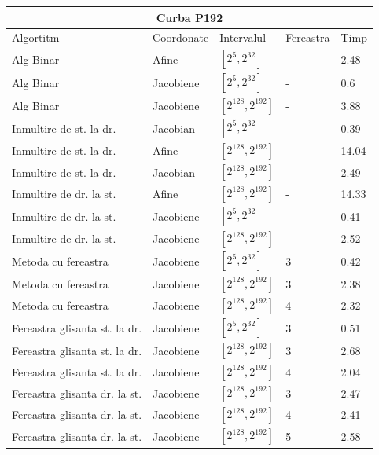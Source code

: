 \begin{tabular}{ |p{5cm}||p{3cm}|p{3cm}|p{2cm}|p{1cm}|  }
 \hline
 \multicolumn{5}{|c|}{Curba P192} \\
 \hline
 Algortitm& Coordonate &Intervalul &Fereastra &Timp\\
 \hline
 Alg Binar & Afine  &$[2^{5},2^{32}]$& - & 2.48\\
 Alg Binar&Jacobiene  & $[2^{5},2^{32}]$ & - & 0.6\\
 Alg Binar&Jacobiene  & $[2^{128},2^{192}]$ & - & 3.88\\
 Inmultire de st. la dr. & Jacobian & $[2^{5},2^{32}]$& - & 0.39\\
 Inmultire de st. la dr. & Afine & $[2^{128},2^{192}]$& - & 14.04\\
 Inmultire de st. la dr. & Jacobian & $[2^{128},2^{192}]$& - & 2.49\\
 Inmultire de dr. la st. &Afine & $[2^{128},2^{192}]$ & - & 14.33\\
 Inmultire de dr. la st. &Jacobiene & $[2^{5},2^{32}]$ & - & 0.41\\
 Inmultire de dr. la st. &Jacobiene & $[2^{128},2^{192}]$ & - & 2.52\\
 Metoda cu fereastra& Jacobiene & $[2^{5},2^{32}]$ & 3 & 0.42\\
 Metoda cu fereastra& Jacobiene & $[2^{128},2^{192}]$ & 3 & 2.38\\
 Metoda cu fereastra& Jacobiene & $[2^{128},2^{192}]$ & 4 & 2.32\\
 Fereastra glisanta st. la dr.& Jacobiene  & $[2^{5},2^{32}]$& 3 & 0.51\\
 Fereastra glisanta st. la dr.& Jacobiene  & $[2^{128},2^{192}]$& 3 & 2.68\\
  Fereastra glisanta st. la dr.& Jacobiene  & $[2^{128},2^{192}]$& 4 & 2.04\\
 Fereastra glisanta dr. la st.& Jacobiene  & $[2^{128},2^{192}]$& 3 & 2.47\\
 Fereastra glisanta dr. la st.& Jacobiene  & $[2^{128},2^{192}]$& 4 & 2.41\\
 Fereastra glisanta dr. la st.& Jacobiene  & $[2^{128},2^{192}]$& 5 & 2.58\\
 \hline
\end{tabular}

